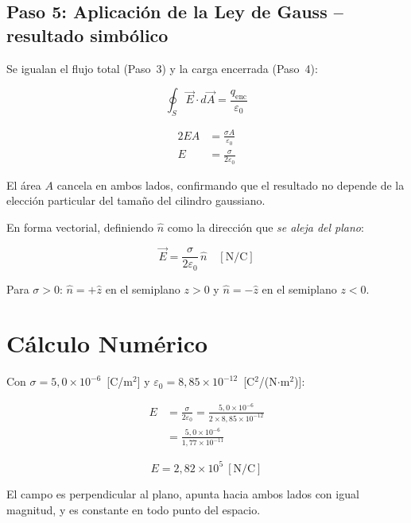 \documentclass[12pt,letterpaper]{article}
\begin{document}
\bigskip

\subsection*{Paso 5: Aplicaci\'on de la Ley de Gauss -- resultado simb\'olico}

Se igualan el flujo total (Paso~3) y la carga encerrada (Paso~4):

\[
    \oint_S \vec{E}\cdot d\vec{A} = \frac{q_\text{enc}}{\varepsilon_0}
\]

\begin{align*}
    2EA
        &= \frac{\sigma A}{\varepsilon_0} \\[8pt]
    E
        &= \frac{\sigma}{2\varepsilon_0}
\end{align*}

El \'area $A$ cancela en ambos lados, confirmando que el resultado no depende
de la elecci\'on particular del tama\~no del cilindro gaussiano.

En forma vectorial, definiendo $\hat{n}$ como la direcci\'on que \emph{se aleja del plano}:

\[
    \boxed{
        \vec{E} = \frac{\sigma}{2\varepsilon_0}\,\hat{n}
        \quad [\text{N/C}]
    }
\]

Para $\sigma > 0$: $\hat{n} = +\hat{z}$ en el semiplano $z > 0$ y
$\hat{n} = -\hat{z}$ en el semiplano $z < 0$.

\section*{C\'alculo Num\'erico}

Con $\sigma = 5{,}0 \times 10^{-6}$~[C/m$^2$] y $\varepsilon_0 = 8{,}85 \times 10^{-12}$~[C$^2$/(N$\cdot$m$^2$)]:

\begin{align*}
    E &= \frac{\sigma}{2\varepsilon_0}
       = \frac{5{,}0 \times 10^{-6}}{2 \times 8{,}85 \times 10^{-12}} \\[8pt]
      &= \frac{5{,}0 \times 10^{-6}}{1{,}77 \times 10^{-11}}
\end{align*}

\[
    \boxed{E = 2{,}82 \times 10^{5}\ [\text{N/C}]}
\]

El campo es perpendicular al plano, apunta hacia ambos lados con igual magnitud,
y es constante en todo punto del espacio.
\end{document}
